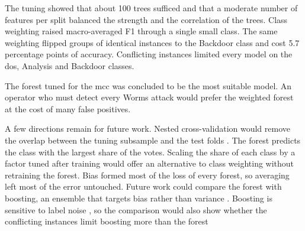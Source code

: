 \documentclass[conference]{IEEEtran}
\begin{document}
The tuning showed that about 100 trees sufficed and that a moderate number of
features per split balanced the strength and the correlation of the trees. Class
weighting raised macro-averaged F1 through a single small class. The same weighting
flipped groups of identical instances to the Backdoor class and cost 5.7 percentage
points of accuracy. Conflicting instances limited every model on the \gls{dos},
Analysis and Backdoor classes.

The forest tuned for the \gls{mcc} was concluded to be the most suitable model. An
operator who must detect every Worms attack would prefer the weighted forest at the
cost of many false positives.

A few directions remain for future work. Nested cross-validation would remove the
overlap between the tuning subsample and the test folds \cite{cawley2010}. 
The forest predicts the class with the largest share of the votes. 
Scaling the share of each class by a factor tuned after training would offer an alternative to 
class weighting without retraining the forest. Bias formed most of the loss of every forest, so averaging left most of the error
untouched. Future work could compare the forest with boosting, an ensemble that targets bias rather than
variance \cite{hastie2009}. Boosting is sensitive to label noise
\cite{frenay2014}, so the comparison would also show whether the conflicting instances limit
boosting more than the forest



\end{document}
